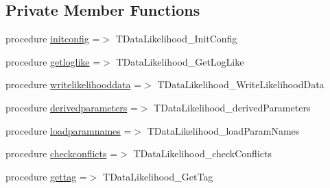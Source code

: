 \subsection*{Private Member Functions}
\begin{DoxyCompactItemize}
\item 
procedure \mbox{\hyperlink{structgeneraltypes_1_1tdatalikelihood_a19dcb969d365a7167d4e8bdcfb6765b3}{initconfig}} =$>$ T\+Data\+Likelihood\+\_\+\+Init\+Config
\item 
procedure \mbox{\hyperlink{structgeneraltypes_1_1tdatalikelihood_a0812781171300de30c3b47f35f23ff91}{getloglike}} =$>$ T\+Data\+Likelihood\+\_\+\+Get\+Log\+Like
\item 
procedure \mbox{\hyperlink{structgeneraltypes_1_1tdatalikelihood_ae8df99bad2813c0d9c8b07a6db89b1ad}{writelikelihooddata}} =$>$ T\+Data\+Likelihood\+\_\+\+Write\+Likelihood\+Data
\item 
procedure \mbox{\hyperlink{structgeneraltypes_1_1tdatalikelihood_a8a8739608a0ee0e108846488d3c993bf}{derivedparameters}} =$>$ T\+Data\+Likelihood\+\_\+derived\+Parameters
\item 
procedure \mbox{\hyperlink{structgeneraltypes_1_1tdatalikelihood_aa68a70bba0a78b894700d8835a2d0ead}{loadparamnames}} =$>$ T\+Data\+Likelihood\+\_\+load\+Param\+Names
\item 
procedure \mbox{\hyperlink{structgeneraltypes_1_1tdatalikelihood_a93194c3b57610c0642904aec30d2fc27}{checkconflicts}} =$>$ T\+Data\+Likelihood\+\_\+check\+Conflicts
\item 
procedure \mbox{\hyperlink{structgeneraltypes_1_1tdatalikelihood_a7a19d3a27845260b609816e9ca018f2a}{gettag}} =$>$ T\+Data\+Likelihood\+\_\+\+Get\+Tag
\end{DoxyCompactItemize}
